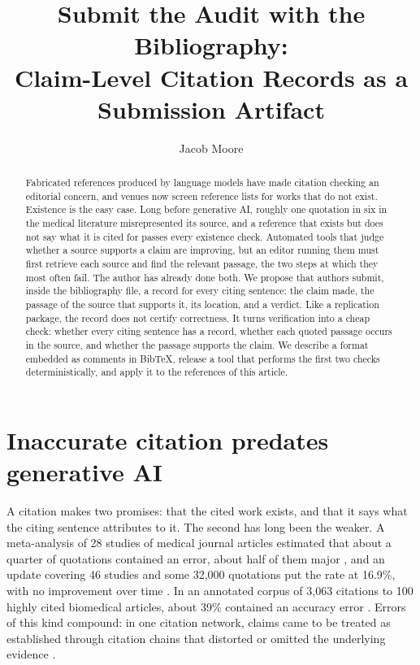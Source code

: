 \documentclass[11pt]{article}
\title{Submit the Audit with the Bibliography:\\Claim-Level Citation Records as a Submission Artifact}
\author{Jacob Moore\\\TBD{affiliation}}
\date{}
\begin{document}
\maketitle

\begin{abstract}
Fabricated references produced by language models have made citation checking an editorial concern, and venues now screen reference lists for works that do not exist. Existence is the easy case. Long before generative AI, roughly one quotation in six in the medical literature misrepresented its source, and a reference that exists but does not say what it is cited for passes every existence check. Automated tools that judge whether a source supports a claim are improving, but an editor running them must first retrieve each source and find the relevant passage, the two steps at which they most often fail. The author has already done both. We propose that authors submit, inside the bibliography file, a record for every citing sentence: the claim made, the passage of the source that supports it, its location, and a verdict. Like a replication package, the record does not certify correctness. It turns verification into a cheap check: whether every citing sentence has a record, whether each quoted passage occurs in the source, and whether the passage supports the claim. We describe a format embedded as comments in BibTeX, release a tool that performs the first two checks deterministically, and apply it to the references of this article.
\end{abstract}

\section{Inaccurate citation predates generative AI}

A citation makes two promises: that the cited work exists, and that it says what the citing sentence attributes to it. The second has long been the weaker. A meta-analysis of 28 studies of medical journal articles estimated that about a quarter of quotations contained an error, about half of them major \citep{jergas2015quotation}, and an update covering 46 studies and some 32,000 quotations put the rate at 16.9\%, with no improvement over time \citep{baethge2025quotation}. In an annotated corpus of 3,063 citations to 100 highly cited biomedical articles, about 39\% contained an accuracy error \citep{sarol2024citationintegrity}. Errors of this kind compound: in one citation network, claims came to be treated as established through citation chains that distorted or omitted the underlying evidence \citep{greenberg2009distortion}.
\end{document}
